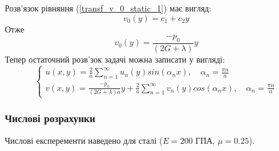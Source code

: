 Розв'язок рівняння (\ref{transf_v_0_static_1}) має вигляд:
\begin{equation}
    v_0(y) = c_1 + c_2 y
\end{equation}
Отже 
\begin{equation}
    v_0(y) = \frac{-p_0}{(2G + \lambda)}y
\end{equation}
Тепер остаточний розв'зок задачі можна записати у вигляді:
\begin{equation}
    \begin{cases}
        u(x,y) = \frac{2}{a} \sum_{n=1}^{\infty} u_n(y) sin(\alpha_n x), \quad \alpha_n = \frac{\pi n}{a} \\
        v(x,y) = \frac{-p_0}{(2G + \lambda)a}y + \frac{2}{a} \sum_{n=1}^{\infty} v_n(y) cos(\alpha_n x), \quad \alpha_n = \frac{\pi n}{a}
    \end{cases}
\end{equation}

\subsubsection{Числові розрахунки}
Числові експеременти наведено для сталі ($E=200$ ГПА, $\mu=0.25$).

